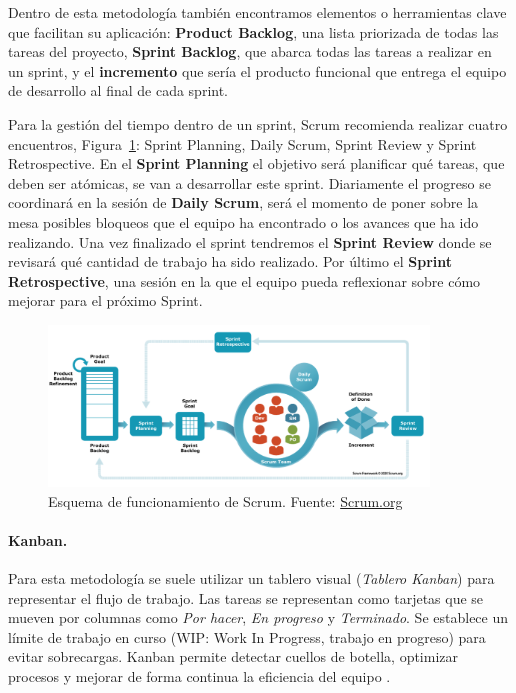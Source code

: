 Dentro de esta metodología también encontramos elementos o herramientas clave que facilitan su aplicación: \textbf{Product Backlog}, una lista priorizada de todas las tareas del proyecto, \textbf{Sprint Backlog}, que abarca todas las tareas a realizar en un sprint, y el \textbf{incremento} que sería el producto funcional que entrega el equipo de desarrollo al final de cada sprint.

Para la gestión del tiempo dentro de un sprint, Scrum recomienda realizar cuatro encuentros, Figura~\ref{fig:scrum}: Sprint Planning, Daily Scrum, Sprint Review y Sprint Retrospective. En el \textbf{Sprint Planning} el objetivo será planificar qué tareas, que deben ser atómicas, se van a desarrollar este sprint. Diariamente el progreso se coordinará en la sesión de \textbf{Daily Scrum}, será el momento de poner sobre la mesa posibles bloqueos que el equipo ha encontrado o los avances que ha ido realizando. Una vez finalizado el sprint tendremos el \textbf{Sprint Review} donde se revisará qué cantidad de trabajo ha sido realizado. Por último el \textbf{Sprint Retrospective}, una sesión en la que el equipo pueda reflexionar sobre cómo mejorar para el próximo Sprint.

\begin{figure}[H]
\centering
\includegraphics[width=0.9\textwidth]{./img/methodologies/scrum.png}
\caption{Esquema de funcionamiento de Scrum.  Fuente: \href{https://www.scrum.org/learning-series/what-is-scrum/}{Scrum.org}}
\label{fig:scrum}
\end{figure}

\paragraph{Kanban.} Para esta metodología se suele utilizar un tablero visual (\textit{Tablero Kanban}) para representar el flujo de trabajo. Las tareas se representan como tarjetas que se mueven por columnas como \textit{Por hacer}, \textit{En progreso} y \textit{Terminado}. Se establece un límite de trabajo en curso (WIP: Work In Progress, trabajo en progreso) para evitar sobrecargas. Kanban permite detectar cuellos de botella, optimizar procesos y mejorar de forma continua la eficiencia del equipo \cite{kanban}.

